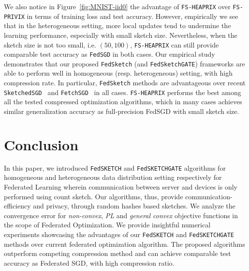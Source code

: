 \documentclass{article}
\begin{document}
We also notice in Figure~\ref{fig:MNIST-iid0} the advantage of \texttt{FS-HEAPRIX} over \texttt{FS-PRIVIX} in terms of training loss and test accuracy. 
However, empirically we see that in the heterogeneous setting, more local updates tend to undermine the learning performance, especially with small sketch size.  
Nevertheless, when the sketch size is not too small, i.e. $(50,100)$, \texttt{FS-HEAPRIX} can still provide comparable test accuracy as \texttt{FedSGD} in both cases.
Our empirical study demonstrates that our proposed \texttt{FedSketch} (and \texttt{FedSketchGATE}) frameworks are able to perform well in homogeneous (resp. heterogeneous) setting, with high compression rate. 
In particular, \texttt{FedSketch} methods are advantageous over recent \texttt{SketchedSGD}~\citep{ivkin2019communication} and \texttt{FetchSGD}~\cite{rothchild2020fetchsgd} in all cases. 
\texttt{FS-HEAPRIX} performs the best among all the tested compressed optimization algorithms, which in many cases achieves similar generalization accuracy as full-precision FedSGD with small sketch size. 

\vspace{-0.1in}
\section{Conclusion}
\vspace{-0.05in}

In this paper, we introduced \texttt{FedSKETCH} and \texttt{FedSKETCHGATE} algorithms for homogeneous and heterogeneous data distribution setting respectively for Federated Learning wherein communication between server and devices is only performed using count sketch. 
Our algorithms, thus, provide communication-efficiency and privacy, through random hashes based sketches. 
We analyze the convergence error for \emph{non-convex}, \emph{PL} and \emph{general convex} objective functions in the scope of Federated Optimization.  
We provide insightful numerical experiments showcasing the advantages of our \texttt{FedSKETCH} and \texttt{FedSKETCHGATE} methods over current federated optimization algorithm. The proposed algorithms outperform competing compression method and can achieve comparable test accuracy as Federated SGD, with high compression ratio.


\newpage
\clearpage\balance


\newpage
\appendix
%

\onecolumn
\end{document}
